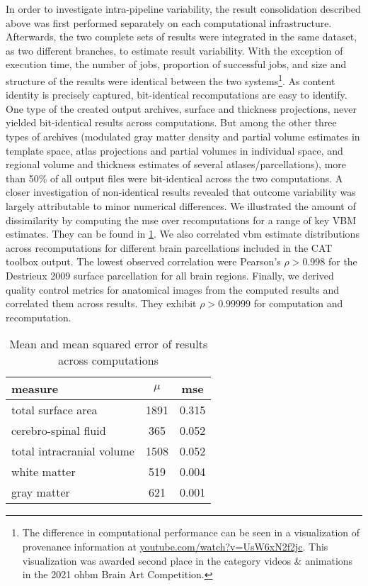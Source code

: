 In order to investigate intra-pipeline variability, the result consolidation described above was first performed separately on each computational infrastructure.
Afterwards, the two complete sets of results were integrated in the same dataset, as two different branches, to estimate result variability.
With the exception of execution time, the number of jobs, proportion of successful jobs, and size and structure of the results were identical between the two systems\footnote{The difference in computational performance can be seen in a visualization of provenance information at \url{youtube.com/watch?v=UsW6xN2f2jc}. This visualization was awarded second place in the category videos \& animations in the 2021 \gls{ohbm} Brain Art Competition.}.
As content identity is precisely captured, bit-identical recomputations are easy to identify.
One type of the created output archives, surface and thickness projections, never yielded bit-identical results across computations.
But among the other three types of archives (modulated gray matter density and partial volume estimates in template space, atlas projections and partial volumes in individual space, and regional volume and thickness estimates of several atlases/parcellations), more than 50\% of all output files were bit-identical across the two computations.
A closer investigation of non-identical results revealed that outcome variability was largely attributable to minor numerical differences.
We illustrated the amount of dissimilarity by computing the \gls{mse} over recomputations for a range of key VBM estimates.
They can be found in \cref{tab:fairly_mse}.
We also correlated \gls{vbm} estimate distributions across recomputations for different brain parcellations included in the CAT toolbox output.
The lowest observed correlation were Pearson’s $\rho > 0.998$ for the Destrieux 2009 surface parcellation \citep{destrieux2010automatic} for all brain regions.
Finally, we derived quality control metrics for anatomical images from the computed results \citep{dahnke_retrospective_2013,dahnke_quality_2015} and correlated them across results.
They exhibit $\rho > 0.99999$ for computation and recomputation.


\begin{table}
	\centering
	\begin{tabular}{lcc}
		\toprule
		measure & $\mu$ & \gls{mse} \\ \midrule
		total surface area & 1891 & 0.315 \\
		cerebro-spinal fluid & 365 & 0.052 \\
        total intracranial volume & 1508 & 0.052\\
        white matter & 519 & 0.004\\
        gray matter & 621 & 0.001\\
		\bottomrule
	\end{tabular}
	\caption[Mean and mean squared error of results across computations]{Mean and mean squared error of results across computations}
	\label{tab:fairly_mse}
\end{table}


